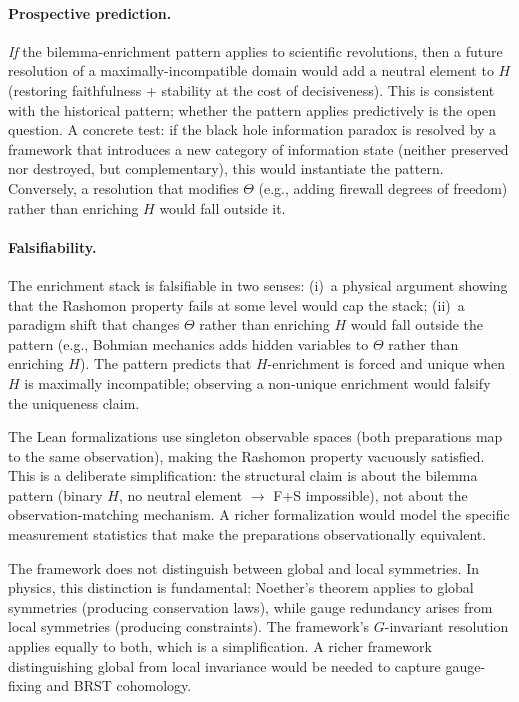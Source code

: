 \documentclass[11pt,a4paper]{article}
\begin{document}
\paragraph{Prospective prediction.}
\emph{If} the bilemma-enrichment pattern applies to scientific revolutions, then a future resolution of a maximally-incompatible domain would add a neutral element to $H$ (restoring faithfulness + stability at the cost of decisiveness).  This is consistent with the historical pattern; whether the pattern applies predictively is the open question.  A concrete test: if the black hole information paradox is resolved by a framework that introduces a new category of information state (neither preserved nor destroyed, but complementary), this would instantiate the pattern. Conversely, a resolution that modifies $\Theta$ (e.g., adding firewall degrees of freedom) rather than enriching $H$ would fall outside it.

\paragraph{Falsifiability.}
The enrichment stack is falsifiable in two senses: (i)~a physical argument showing that the Rashomon property fails at some level would cap the stack; (ii)~a paradigm shift that changes $\Theta$ rather than enriching $H$ would fall outside the pattern (e.g., Bohmian mechanics adds hidden variables to $\Theta$ rather than enriching $H$). The pattern predicts that $H$-enrichment is forced and unique when $H$ is maximally incompatible; observing a non-unique enrichment would falsify the uniqueness claim.

The Lean formalizations use singleton observable spaces (both preparations map to the same observation), making the Rashomon property vacuously satisfied.  This is a deliberate simplification: the structural claim is about the bilemma pattern (binary $H$, no neutral element $\to$ F+S impossible), not about the observation-matching mechanism.  A richer formalization would model the specific measurement statistics that make the preparations observationally equivalent.

The framework does not distinguish between global and local symmetries.  In physics, this distinction is fundamental: Noether's theorem applies to global symmetries (producing conservation laws), while gauge redundancy arises from local symmetries (producing constraints).  The framework's $G$-invariant resolution applies equally to both, which is a simplification.  A richer framework distinguishing global from local invariance would be needed to capture gauge-fixing and BRST cohomology.
\end{document}

